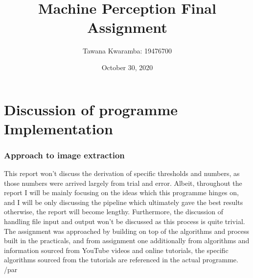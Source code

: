 \documentclass[
	12pt, %
]{fphw}
\title{Machine Perception Final Assignment} %
\author{Tawana Kwaramba: 19476700} %
\date{October 30, 2020} %
\institute{Curtin University \\ Faculty of Science and Engineering: School of Civil and Mechanical Engineering} %
\begin{document}
\maketitle
\newpage


\newpage
\begin{spacing}{0.1}
\newpage
\newpage
\tableofcontents
\newpage
\listoffigures
\newpage
\listoftables
\newpage
\end{spacing}

\part{Discussion of programme Implementation}
\newpage



\newpage
\section{Approach to image extraction}
This report won’t discuss the derivation of specific thresholds and numbers, as those numbers were arrived largely from trial and error. Albeit, throughout the report I will be mainly focusing on the ideas which this programme hinges on, and I will be only discussing the pipeline which ultimately gave the best results otherwise, the report will become lengthy. Furthermore, the discussion of handling file input and output won’t be discussed as this process is quite trivial. The assignment was approached by building on top of the algorithms and process built in the practicals, and from assignment one additionally from algorithms and information sourced from YouTube videos and online tutorials, the specific algorithms sourced from the tutorials are referenced in the actual programme. /par
\end{document}
